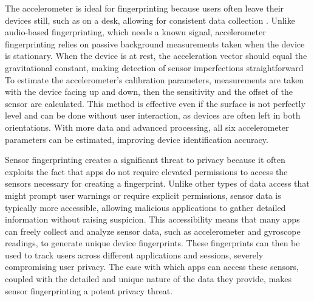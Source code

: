 \documentclass[11pt,
  oneside,openany,    %
]{scrreprt}
\begin{document}
The accelerometer is ideal for fingerprinting because users often leave their devices still, such as on a desk, allowing for consistent data collection \cite{DBLP:conf/ndss/DeyRXCN14, DBLP:conf/sp/ZhangBS19, DBLP:journals/comsur/BaldiniS17}.
Unlike audio-based fingerprinting, which needs a known signal, accelerometer fingerprinting relies on passive background measurements taken when the device is stationary.
When the device is at rest, the acceleration vector should equal the gravitational constant, making detection of sensor imperfections straightforward
To estimate the accelerometer's calibration parameters, measurements are taken with the device facing up and down, then the sensitivity and the offset of the sensor are calculated.
This method is effective even if the surface is not perfectly level and can be done without user interaction, as devices are often left in both orientations.
With more data and advanced processing, all six accelerometer parameters can be estimated, improving device identification accuracy.

Sensor fingerprinting creates a significant threat to privacy because it often exploits the fact that apps do not require elevated permissions to access the sensors necessary for creating a fingerprint.
Unlike other types of data access that might prompt user warnings or require explicit permissions, sensor data is typically more accessible, allowing malicious applications to gather detailed information without raising suspicion. 
This accessibility means that many apps can freely collect and analyze sensor data, such as accelerometer and gyroscope readings, to generate unique device fingerprints.
These fingerprints can then be used to track users across different applications and sessions, severely compromising user privacy.
The ease with which apps can access these sensors, coupled with the detailed and unique nature of the data they provide, makes sensor fingerprinting a potent privacy threat.
\end{document}
